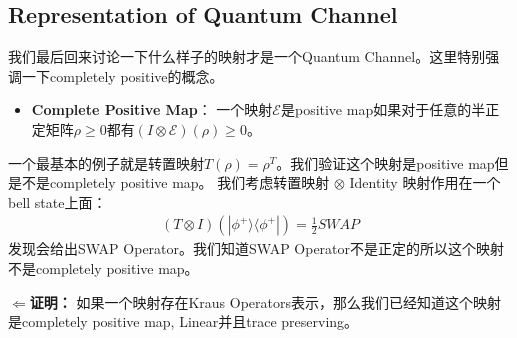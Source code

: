 \subsection{Representation of Quantum Channel}


我们最后回来讨论一下什么样子的映射才是一个Quantum Channel。这里特别强调一下completely positive的概念。
\begin{itemize}
  \item \textbf{Complete Positive Map}： 一个映射$ \mathcal{E} $是positive map如果对于任意的半正定矩阵$ \rho\geq0 $都有$ (I \otimes \mathcal{E})(\rho)\geq0 $。
\end{itemize}


\bigskip
{}
  
一个最基本的例子就是转置映射$ T(\rho)=\rho^T $。我们验证这个映射是positive map但是不是completely positive map。
我们考虑转置映射 $ \otimes $ Identity 映射作用在一个bell state上面：
\begin{align}
  (T\otimes I)(|\phi^+\rangle\langle\phi^+|) = \displaystyle\frac{1}{2} SWAP
\end{align}
发现会给出SWAP Operator。我们知道SWAP Operator不是正定的所以这个映射不是completely positive map。

\bigskip 
{}

\textbf{$ \Leftarrow $证明：} 如果一个映射存在Kraus Operators表示，那么我们已经知道这个映射是completely positive map, Linear并且trace preserving。 

